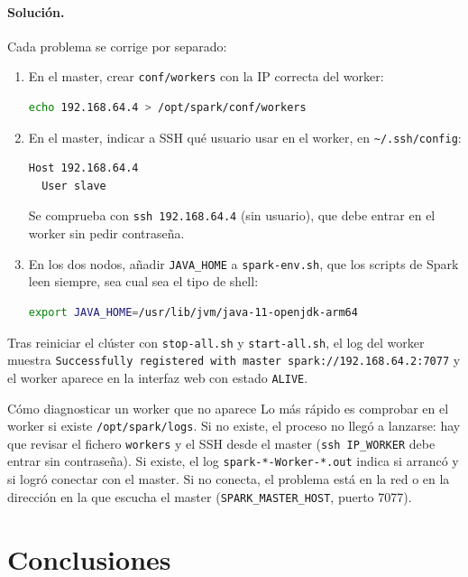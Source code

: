 \documentclass[11pt,a4paper]{article}
\begin{document}
\paragraph{Solución.} Cada problema se corrige por separado:
\begin{enumerate}
  \item En el master, crear \texttt{conf/workers} con la IP correcta del worker:
\begin{lstlisting}[language=bash]
echo 192.168.64.4 > /opt/spark/conf/workers
\end{lstlisting}
  \item En el master, indicar a SSH qué usuario usar en el worker, en \texttt{\textasciitilde/.ssh/config}:
\begin{lstlisting}
Host 192.168.64.4
  User slave
\end{lstlisting}
  Se comprueba con \texttt{ssh 192.168.64.4} (sin usuario), que debe entrar en el worker sin pedir contraseña.
  \item En los dos nodos, añadir \texttt{JAVA\_HOME} a \texttt{spark-env.sh}, que los scripts de Spark leen siempre, sea cual sea el tipo de shell:
\begin{lstlisting}[language=bash]
export JAVA_HOME=/usr/lib/jvm/java-11-openjdk-arm64
\end{lstlisting}
\end{enumerate}

Tras reiniciar el clúster con \texttt{stop-all.sh} y \texttt{start-all.sh}, el log del worker muestra \texttt{Successfully registered with master spark://192.168.64.2:7077} y el worker aparece en la interfaz web con estado \texttt{ALIVE}.

\begin{concepto}{Cómo diagnosticar un worker que no aparece}
Lo más rápido es comprobar en el worker si existe \texttt{/opt/spark/logs}. Si no existe, el proceso no llegó a lanzarse: hay que revisar el fichero \texttt{workers} y el SSH desde el master (\texttt{ssh IP\_WORKER} debe entrar sin contraseña). Si existe, el log \texttt{spark-*-Worker-*.out} indica si arrancó y si logró conectar con el master. Si no conecta, el problema está en la red o en la dirección en la que escucha el master (\texttt{SPARK\_MASTER\_HOST}, puerto 7077).
\end{concepto}

\section{Conclusiones}
\end{document}
